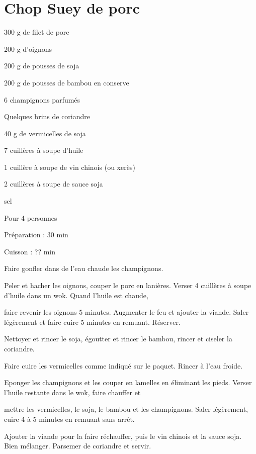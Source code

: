 \section[\normalsize{Chop Suey de porc}]{Chop Suey de porc}

\begin{ingredients}
\item 300 g de filet de porc
\item 200 g d'oignons
\item 200 g de pousses de soja
\item 200 g de pousses de bambou en conserve
\item 6 champignons parfum\'es
\item Quelques brins de coriandre
\item 40 g de vermicelles de soja
\item 7 cuill\`eres \`a soupe d'huile
\item 1 cuill\`ere \`a soupe de vin chinois (ou xer\`es)
\item 2 cuill\`eres \`a soupe de sauce soja
\item sel
\end{ingredients}
\begin{infos}
\item Pour 4 personnes
\item Préparation : 30 min
\item Cuisson : ?? min
\end{infos}
\begin{etapes}
\item Faire gonfler dans de l'eau chaude les champignons.
\item Peler et hacher les oignons, couper le porc en lani\`eres. Verser 4 cuill\`eres \`a soupe d'huile dans un wok. Quand l'huile est chaude, 
\item faire revenir les oignons 5 minutes. Augmenter le feu et ajouter la viande. Saler l\'eg\`erement et faire cuire 5 minutes en remuant. R\'eserver.
\item Nettoyer et rincer le soja, \'egoutter et rincer le bambou, rincer et ciseler la coriandre.
\item Faire cuire les vermicelles comme indiqu\'e sur le paquet. Rincer \`a l'eau froide.
\item Eponger les champignons et les couper en lamelles en \'eliminant les pieds. Verser l'huile restante dans le wok, faire chauffer et
\item mettre les vermicelles, le soja, le bambou et les champignons. Saler l\'eg\`erement, cuire 4 \`a 5 minutes en remuant sans arr\^et.
\item Ajouter la viande pour la faire r\'echauffer, puis le vin chinois et la sauce soja. Bien m\'elanger. Parsemer de coriandre et servir.
\end{etapes}
\begin{conseils}
\end{conseils}

